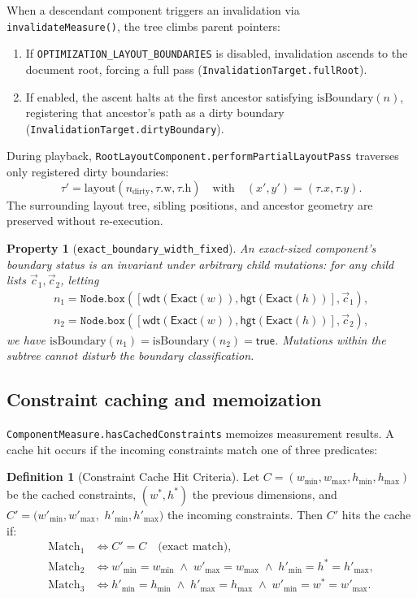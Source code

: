 \documentclass[11pt,a4paper]{article}
\newcommand{\Exact}{\mathsf{Exact}}
\newcommand{\wdt}{\mathsf{wdt}}
\newcommand{\hgt}{\mathsf{hgt}}
\newcommand{\lo}[1]{\texttt{#1}}       %
\newcommand{\jv}[1]{\texttt{#1}}       %
\theoremstyle{definition}
\newtheorem{definition}{Definition}[section]
\theoremstyle{plain}
\newtheorem{property}{Property}[section]
\theoremstyle{remark}
\begin{document}
When a descendant component triggers an invalidation via \jv{invalidateMeasure()},
the tree climbs parent pointers:
\begin{enumerate}
  \item If \jv{OPTIMIZATION\_LAYOUT\_BOUNDARIES} is disabled, invalidation ascends to
  the document root, forcing a full pass (\lo{InvalidationTarget.fullRoot}).
  \item If enabled, the ascent halts at the first ancestor satisfying
  $\mathrm{isBoundary}(n)$, registering that ancestor's path as a dirty boundary
  (\lo{InvalidationTarget.dirtyBoundary}).
\end{enumerate}

During playback, \jv{RootLayoutComponent.performPartialLayoutPass} traverses only
registered dirty boundaries:
\[
  \tau' = \mathrm{layout}(n_{\mathrm{dirty}}, \tau.\mathrm{w}, \tau.\mathrm{h})
  \quad\text{with}\quad
  (x', y') = (\tau.x, \tau.y).
\]
The surrounding layout tree, sibling positions, and ancestor geometry are
preserved without re-execution.

\begin{property}[\lo{exact\_boundary\_width\_fixed}]
An exact-sized component's boundary status is an invariant under arbitrary child
mutations: for any child lists $\vec{c}_1, \vec{c}_2$, letting
\begin{gather*}
  n_1 = \lo{Node.box}([\wdt(\Exact(w)), \hgt(\Exact(h))], \vec{c}_1), \\
  n_2 = \lo{Node.box}([\wdt(\Exact(w)), \hgt(\Exact(h))], \vec{c}_2),
\end{gather*}
we have $\mathrm{isBoundary}(n_1) = \mathrm{isBoundary}(n_2) = \textsf{true}$.
Mutations within the subtree cannot disturb the boundary classification.
\end{property}

\subsection{Constraint caching and memoization}
\label{sec:opt-cache}

\jv{ComponentMeasure.hasCachedConstraints} memoizes measurement results. A cache
hit occurs if the incoming constraints match one of three predicates:
\begin{definition}[Constraint Cache Hit Criteria]
Let $C = (w_{\min}, w_{\max}, h_{\min}, h_{\max})$ be the cached constraints,
$(w^*, h^*)$ the previous dimensions, and $C' = (w'_{\min}, w'_{\max},$
$h'_{\min}, h'_{\max})$ the incoming constraints. Then $C'$ hits the cache if:
\begin{align*}
  \mathrm{Match}_1 &\iff C' = C \quad \text{(exact match)}, \\
  \mathrm{Match}_2 &\iff w'_{\min} = w_{\min} \;\land\; w'_{\max} = w_{\max} \;\land\;
  h'_{\min} = h^* = h'_{\max}, \\
  \mathrm{Match}_3 &\iff h'_{\min} = h_{\min} \;\land\; h'_{\max} = h_{\max} \;\land\;
  w'_{\min} = w^* = w'_{\max}.
\end{align*}
\end{definition}
\end{document}
